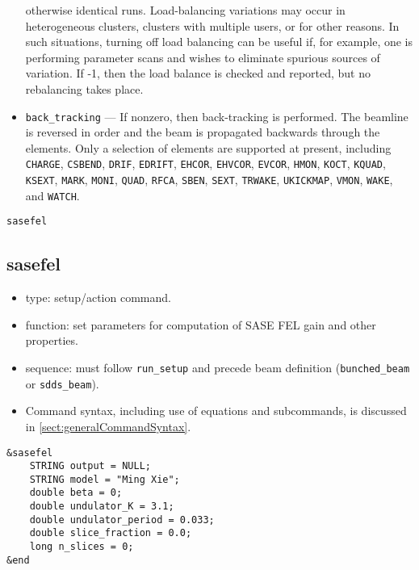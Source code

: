\documentclass[11pt]{article}
\begin{document}
\begin{itemize}
 otherwise identical runs.  Load-balancing variations may occur in heterogeneous clusters,
 clusters with multiple users, or for other reasons.  In such situations, turning off 
 load balancing can be useful if, for example, one is performing parameter scans and
 wishes to eliminate spurious sources of variation.
 If -1, then the load balance is checked and reported, but no rebalancing takes place.
\item \verb|back_tracking| --- If nonzero, then back-tracking is performed. The beamline is reversed in
  order and the beam is propagated backwards through the elements. Only a selection of elements are supported at
  present, including \verb|CHARGE|, \verb|CSBEND|, \verb|DRIF|, \verb|EDRIFT|, \verb|EHCOR|, \verb|EHVCOR|,
  \verb|EVCOR|, \verb|HMON|, \verb|KOCT|, \verb|KQUAD|, \verb|KSEXT|, \verb|MARK|, \verb|MONI|, \verb|QUAD|, \verb|RFCA|, 
  \verb|SBEN|, \verb|SEXT|, \verb|TRWAKE|, \verb|UKICKMAP|, \verb|VMON|, \verb|WAKE|, and \verb|WATCH|.
\end{itemize}

\newpage
\begin{center}{\Large\verb|sasefel|}\end{center}
\subsection{sasefel \label{subsec:sasefel}}

\begin{itemize}
\item type: setup/action command.
\item function: set parameters for computation of SASE FEL gain and other properties.
\item sequence: must follow \verb|run_setup| and precede beam definition (\verb|bunched_beam| or \verb|sdds_beam|).
\item Command syntax, including use of equations and subcommands, is discussed in \ref{sect:generalCommandSyntax}.
\end{itemize}

\begin{verbatim}
&sasefel
    STRING output = NULL;
    STRING model = "Ming Xie";
    double beta = 0;
    double undulator_K = 3.1;
    double undulator_period = 0.033;
    double slice_fraction = 0.0;
    long n_slices = 0;
&end
\end{verbatim}
\end{document}
